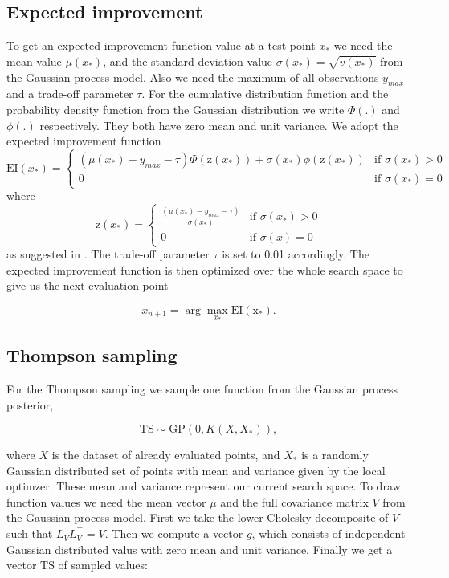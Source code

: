 \subsection{Expected improvement}
To get an expected improvement function value at a test point $x_*$ we need the mean value $\mu(x_*)$, and the standard deviation value $\sigma(x_*) = \sqrt{v(x_*)}$ from the Gaussian process model. Also we need the maximum of all observations $y_{max}$ and a trade-off parameter $\tau$. For the cumulative distribution function and the probability density function from the Gaussian distribution we write $\Phi(.)$ and $\phi(.)$ respectively. They both have zero mean and unit variance.
We adopt the expected improvement function
\[
    \mathrm{EI}(x_*)=
\begin{cases}
    (\mu(x_*) - y_{max} - \tau)\Phi(\mathrm{z}(x_*))+\sigma(x_*)\phi(\mathrm{z}(x_*))& \text{if } \sigma(x_*)> 0\\
    0 & \text{if } \sigma(x_*)= 0
\end{cases}
\]
where
\[
    \mathrm{z}(x_*)=
\begin{cases}
    \frac{(\mu(x_*) -y_{max} - \tau)}{\sigma(x_*)} & \text{if } \sigma(x_*)> 0\\
    0 & \text{if } \sigma(x)= 0
\end{cases}
\]
as suggested in \cite{brochu2010tutorial}. The trade-off parameter $\tau$ is set to 0.01 accordingly. The expected improvement function is then optimized over the whole search space to give us the next evaluation point

$$x_{n+1} = \arg \max_{x_*} \mathrm{EI(x_*)}.$$

\subsection{Thompson sampling}
For the Thompson sampling we sample one function from the Gaussian process posterior,

$$\mathrm{TS}\sim \mathrm{GP}(0,K(X,X_*)),$$

where $X$ is the dataset of already evaluated points, and $X_*$ is a randomly Gaussian distributed set of points with mean and variance given by the local optimzer. These mean and variance represent our current search space.
To draw function values we need the mean vector $\mu$ and the full covariance matrix $V$ from the Gaussian process model. First we take the lower Cholesky decomposite of $V$ such that $L_V L_V^\top = V$. Then we compute a vector $g$, which consists of independent Gaussian distributed valus with zero mean and unit variance. Finally we get a vector $\mathrm{TS}$ of sampled values:

